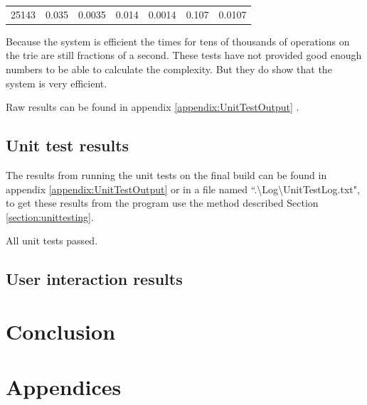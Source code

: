 \documentclass[10pt]{article} %
\begin{document}
\begin{table}[h]
\begin{tabular}{lllllll}
                \cellcolor[HTML]{EFEFEF}25143                                                    & 0.035                                & 0.0035                                     & 0.014                               & 0.0014                                   & 0.107                                    & 0.0107                                       
                \end{tabular}
                \end{table}
                
                Because the system is efficient the times for tens of thousands of operations on the trie are still fractions of a second.
                These tests have not provided good enough numbers to be able to calculate the complexity. But they do show that the system is very efficient.
                
                Raw results can be found in appendix \ref{appendix:UnitTestOutput} .
            \subsection{Unit test results}
			     The results from running the unit tests on the final build can be found in appendix \ref{appendix:UnitTestOutput} or in a file named ``.\textbackslash Log\textbackslash UnitTestLog.txt", to get these results from the program use the method described Section \ref{section:unittesting}.
			     
			     All unit tests passed.
			     
			\subsection{User interaction results}
            
    \section{Conclusion}
	\newpage
	\printbibliography
	\newpage
	
    \appendix
    \section*{Appendices}
    \renewcommand{\thesubsection}{\Alph{subsection}}
\end{document}
